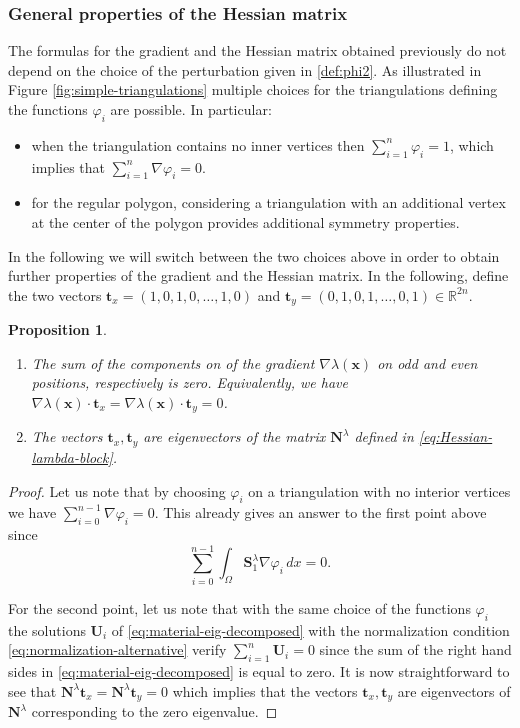 \documentclass[11pt]{article}
\newcommand{\skpt}{\smallskip}
\numberwithin{equation}{section}\newtheorem*{jepEnonce}{\jepEnonceTitle}\newenvironment{enonce*}[1]{\def\jepEnonceTitle{#1}\jepEnonce}{\endjepEnonce}\newtheorem*{conj*}{Conjecture}
\theoremstyle{plain}
\newtheorem{propo}[thm]{Proposition}
\theoremstyle{definition}
\newcommand{\bo}[1]{{\boldsymbol#1}}
\let\Bbb\mathbb
\begin{document}
\subsubsection*{General properties of the Hessian matrix} The formulas for the gradient and the Hessian matrix obtained previously do not depend on the choice of the perturbation given in \eqref{def:phi2}. As illustrated in Figure \ref{fig:simple-triangulations} multiple choices for the triangulations defining the functions $\varphi_i$ are possible. In particular:
\begin{itemize}
\item when the triangulation contains no inner vertices then $\sum_{i=1}^n \varphi_i=1$, which implies that $\sum_{i=1}^n \nabla \varphi_i = 0$.
\item for the regular polygon, considering a triangulation with an additional vertex at the center of the polygon provides additional symmetry properties.
\end{itemize}
In the following we will switch between the two choices above in order to obtain further properties of the gradient and the Hessian matrix. In the following, define the two vectors $\bo t_x = (1,0,1,0,\dots,1,0)$ and $\bo t_y = (0,1,0,1,\dots,0,1) \in \Bbb{R}^{2n}$.

\skpt
\begin{propo}\label{prop:translation-eigenvectors}
\begin{enumerate}
\item
The sum of the components on of the gradient $\nabla \lambda(\bo x)$ on odd and even positions, respectively is zero. Equivalently, we have $\nabla \lambda(\bo x) \cdot \bo t_x = \nabla \lambda(\bo x) \cdot \bo t_y = 0$.

\item
The vectors $\bo t_x, \bo t_y$ are eigenvectors of the matrix $\bo N^\lambda$ defined in \eqref{eq:Hessian-lambda-block}.
\end{enumerate}
\end{propo}

\begin{proof} Let us note that by choosing $\varphi_i$ on a triangulation with no interior vertices we have $\sum_{i=0}^{n-1} \nabla \varphi_i = 0$. This already gives an answer to the first point above since
\[
\sum_{i=0}^{n-1} \int_\Omega \bo S_1^\lambda \nabla \varphi_i\, dx = 0.
\]

For the second point, let us note that with the same choice of the functions $\varphi_i$ the solutions $\bo U_i$ of \eqref{eq:material-eig-decomposed} with the normalization condition \eqref{eq:normalization-alternative} verify $\sum_{i=1}^n \bo U_i = 0$ since the sum of the right hand sides in \eqref{eq:material-eig-decomposed} is equal to zero. It is now straightforward to see that $\bo N^\lambda \bo t_x = \bo N^\lambda \bo t_y = 0$ which implies that the vectors $\bo t_x,\bo t_y$ are eigenvectors of $\bo N^\lambda$ corresponding to the zero eigenvalue.
\end{proof}
\end{document}
